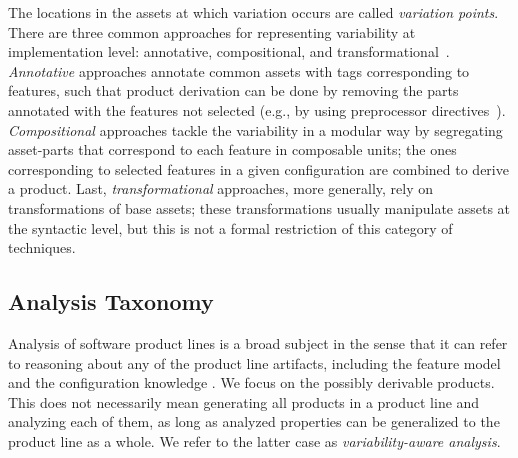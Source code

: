 The locations in the assets at which variation occurs are called \emph{variation points}.
There are three common approaches for representing 
variability at implementation level: annotative, compositional,
and transformational~\cite{Kastner2008,DOPTransformational}.
\emph{Annotative} approaches annotate common assets with
tags corresponding to features, such that product derivation can be done by
removing the parts annotated with the features not selected (e.g., by using preprocessor directives~\cite{PassosExtended}).
\emph{Compositional} approaches tackle the variability in a modular way
by segregating asset-parts that correspond to each feature in composable units;
the ones corresponding to selected features in a given configuration are combined
to derive a product. Last, \emph{transformational} approaches, more generally,  rely on
transformations of base assets;
these transformations usually manipulate assets at
the syntactic level, but this is not a formal
restriction of this category of techniques.


\subsection{Analysis Taxonomy}
\label{sec:analysis-taxonomy}

Analysis of software product lines is a broad subject in the sense that it can refer to
reasoning about any of the product line artifacts, including the feature model
and the configuration knowledge \cite{FOSPL}.
We focus on the possibly derivable products.
This does not necessarily mean generating all products in a product line and analyzing
each of them, as long as analyzed properties can be generalized to the
product line as a whole.
We refer to the latter case as \emph{variability-aware analysis}.

